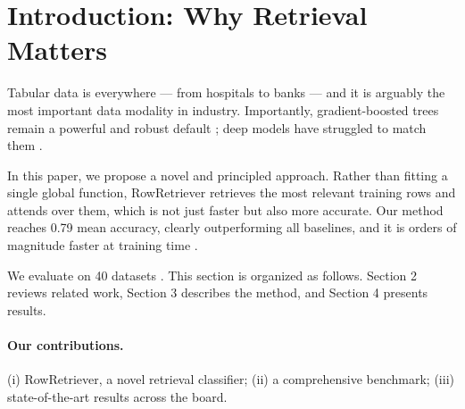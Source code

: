 \section{Introduction: Why Retrieval Matters}
Tabular data is everywhere --- from hospitals to banks --- and it is arguably the most important data modality in industry. Importantly, gradient-boosted trees remain a powerful and robust default \citep{chen2016xgboost}; deep models have struggled to match them \citep{grinsztajn2022tree,shwartz2022tabular,borisov2022deep}.

In this paper, we propose a novel and principled approach. Rather than fitting a single global function, RowRetriever retrieves the most relevant training rows and attends over them, which is not just faster but also more accurate. Our method reaches 0.79 mean accuracy, clearly outperforming all baselines, and it is orders of magnitude faster at training time \citep{NEEDS_CITATION_speed}.

We evaluate on 40 datasets \citep{vanschoren2014openml}. This section is organized as follows. Section 2 reviews related work, Section 3 describes the method, and Section 4 presents results.

\paragraph{Our contributions.}
(i) RowRetriever, a novel retrieval classifier; (ii) a comprehensive benchmark; (iii) state-of-the-art results across the board.
